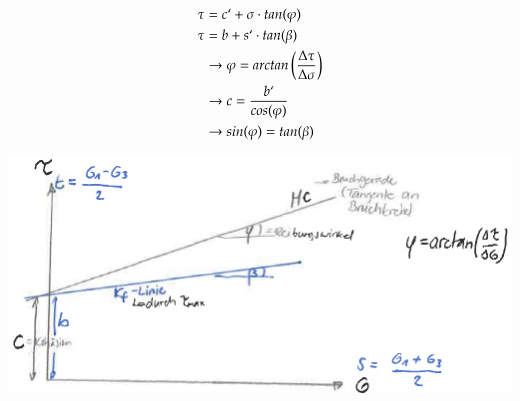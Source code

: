 \begin{minipage}[t]{0.4\linewidth}
	\begin{align*}
		\tau 		&= c`+ \sigma \cdot tan(\varphi) \\
		\tau		&= b + s`\cdot tan(\beta) \\
		& \rightarrow \varphi = arctan \left(\frac{\Delta \tau}{\Delta \sigma}\right) \\
		& \rightarrow c = \frac{b`}{cos(\varphi)} \\
		& \rightarrow sin(\varphi) = tan(\beta) \\
	\end{align*}
\end{minipage}
\begin{minipage}[t]{0.5\linewidth}
	\vspace{\baselineskip}
	\includegraphics[width=\linewidth]{images/MC2Ebenerspraum.PNG}
\end{minipage}



	

